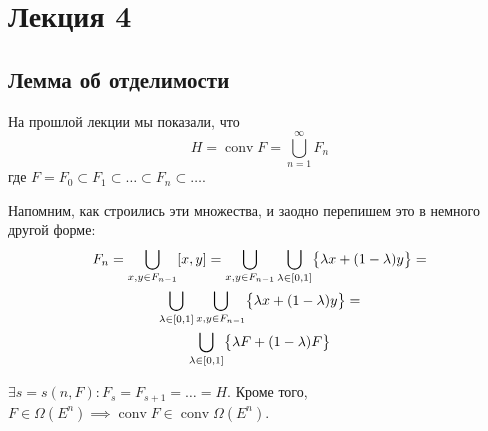 \section{Лекция 4}
\subsection{Лемма об отделимости}
На прошлой лекции мы показали, что
\begin{equation}
    H = \operatorname{conv} F = \bigcup\limits_{n = 1}^{\infty} F_n
\end{equation}
где $F = F_0 \subset F_1 \subset \ldots \subset F_n \subset \ldots$.

Напомним, как строились эти множества, и заодно перепишем это в немного другой форме:
\begin{gather*}
    F_n = \bigcup\limits_{x, y \in F_{n-1}}[x, y] = 
    \bigcup\limits_{x, y \in F_{n-1}} \bigcup\limits_{\lambda \in [0, 1]} \bigl\{ \lambda x + (1 - \lambda)y \bigr\} = \\
    \bigcup\limits_{\lambda \in [0, 1]} \bigcup\limits_{x, y \in F_{n-1}} \bigl\{ \lambda x + (1 - \lambda)y \bigr\} = \\
    \bigcup\limits_{\lambda \in [0, 1]} \bigl\{ \lambda F + (1 - \lambda)F \bigr\}
\end{gather*}

$\exists s = s(n, F)\colon F_s = F_{s+1} = \ldots = H$.
Кроме того, $F \in \Omega(E^n) \implies \operatorname{conv}F \in \operatorname{conv}\Omega(E^n)$.

